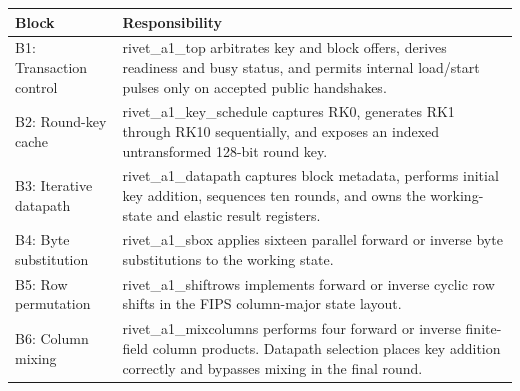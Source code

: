 \documentclass[11pt,a4paper]{article}
\begin{document}
{\small\renewcommand{\arraystretch}{1.18}\begin{longtable}{@{}L{0.24\textwidth}|L{0.7\textwidth}@{}}\toprule

\textbf{Block} & \textbf{Responsibility}\\\midrule\endhead

B1: Transaction control & rivet\_\allowbreak{}a1\_\allowbreak{}top arbitrates key and block offers,\allowbreak{} derives readiness and busy status,\allowbreak{} and permits internal load/\allowbreak{}start pulses only on accepted public handshakes.\\[2pt]\hline

B2: Round-key cache & rivet\_\allowbreak{}a1\_\allowbreak{}key\_\allowbreak{}schedule captures RK0,\allowbreak{} generates RK1 through RK10 sequentially,\allowbreak{} and exposes an indexed untransformed 128-bit round key.\\[2pt]\hline

B3: Iterative datapath & rivet\_\allowbreak{}a1\_\allowbreak{}datapath captures block metadata,\allowbreak{} performs initial key addition,\allowbreak{} sequences ten rounds,\allowbreak{} and owns the working-state and elastic result registers.\\[2pt]\hline

B4: Byte substitution & rivet\_\allowbreak{}a1\_\allowbreak{}sbox applies sixteen parallel forward or inverse byte substitutions to the working state.\\[2pt]\hline

B5: Row permutation & rivet\_\allowbreak{}a1\_\allowbreak{}shiftrows implements forward or inverse cyclic row shifts in the FIPS column-major state layout.\\[2pt]\hline

B6: Column mixing & rivet\_\allowbreak{}a1\_\allowbreak{}mixcolumns performs four forward or inverse finite-field column products. Datapath selection places key addition correctly and bypasses mixing in the final round.\\[2pt]\hline

\bottomrule\end{longtable}}
\end{document}
